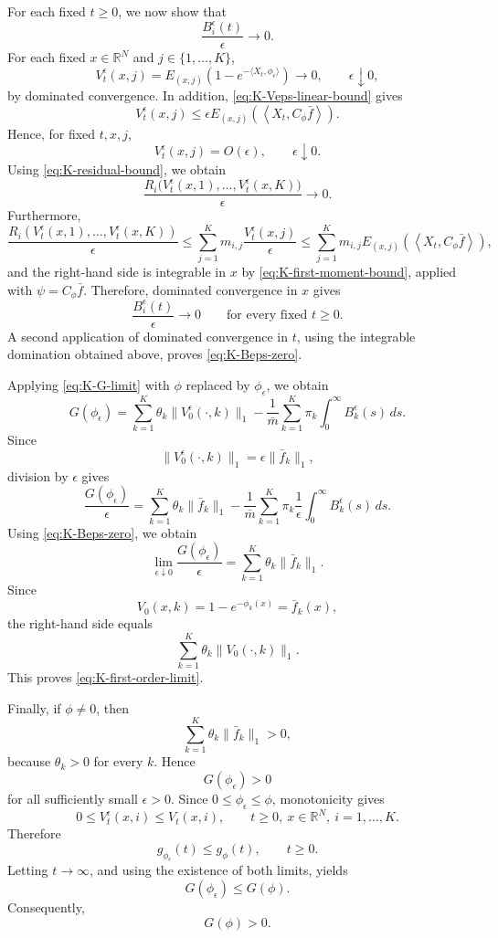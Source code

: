 \documentclass[reqno,final,11pt]{amsart}
\newcommand{\1}{\mathbbm{1}}
\theoremstyle{plain}
\theoremstyle{definition}
\theoremstyle{remark}
\begin{document}
For each fixed \(t\ge0\), we now show that
\[
\frac{B_i^\epsilon(t)}{\epsilon}\longrightarrow0.
\]
For each fixed \(x\in\mathbb R^N\) and \(j\in\{1,\dots,K\}\),
\[
V_t^\epsilon(x,j)
=
E_{(x,j)}
\left(
1-e^{-\langle X_t,\phi_\epsilon\rangle}
\right)
\longrightarrow0,
\qquad \epsilon\downarrow0,
\]
by dominated convergence. In addition, \eqref{eq:K-Veps-linear-bound} gives
\[
V_t^\epsilon(x,j)
\le
\epsilon
E_{(x,j)}
\left(
\left\langle X_t,C_\phi\bar f\right\rangle
\right).
\]
Hence, for fixed \(t,x,j\),
\[
V_t^\epsilon(x,j)=O(\epsilon),
\qquad \epsilon\downarrow0.
\]
Using \eqref{eq:K-residual-bound}, we obtain
\[
\frac{
R_i\bigl(V_t^\epsilon(x,1),\dots,V_t^\epsilon(x,K)\bigr)
}{\epsilon}
\longrightarrow0.
\]
Furthermore,
\[
\frac{R_i(V_t^\epsilon(x,1),\dots,V_t^\epsilon(x,K))}{\epsilon}
\le
\sum_{j=1}^K m_{i,j}
\frac{V_t^\epsilon(x,j)}{\epsilon}
\le
\sum_{j=1}^K m_{i,j}
E_{(x,j)}
\left(
\left\langle X_t,C_\phi\bar f\right\rangle
\right),
\]
and the right-hand side is integrable in \(x\) by \eqref{eq:K-first-moment-bound}, applied
with \(\psi=C_\phi\bar f\). Therefore, dominated convergence in \(x\) gives
\[
\frac{B_i^\epsilon(t)}{\epsilon}\longrightarrow0
\qquad
\text{for every fixed }t\ge0.
\]
A second application of dominated convergence in \(t\), using the integrable domination
obtained above, proves \eqref{eq:K-Beps-zero}.

Applying \eqref{eq:K-G-limit} with \(\phi\) replaced by \(\phi_\epsilon\), we obtain
\[
G(\phi_\epsilon)
=
\sum_{k=1}^K\theta_k\|V_0^\epsilon(\cdot,k)\|_1
-
\frac1{\bar m}
\sum_{k=1}^K\pi_k\int_0^\infty B_k^\epsilon(s)\,ds.
\]
Since
\[
\|V_0^\epsilon(\cdot,k)\|_1
=
\epsilon\|\bar f_k\|_1,
\]
division by \(\epsilon\) gives
\[
\frac{G(\phi_\epsilon)}{\epsilon}
=
\sum_{k=1}^K\theta_k\|\bar f_k\|_1
-
\frac1{\bar m}
\sum_{k=1}^K\pi_k
\frac1\epsilon
\int_0^\infty B_k^\epsilon(s)\,ds.
\]
Using \eqref{eq:K-Beps-zero}, we obtain
\[
\lim_{\epsilon\downarrow0}
\frac{G(\phi_\epsilon)}{\epsilon}
=
\sum_{k=1}^K\theta_k\|\bar f_k\|_1.
\]
Since
\[
V_0(x,k)=1-e^{-\phi_k(x)}=\bar f_k(x),
\]
the right-hand side equals
\[
\sum_{k=1}^K\theta_k\|V_0(\cdot,k)\|_1.
\]
This proves \eqref{eq:K-first-order-limit}.

Finally, if \(\phi\neq0\), then
\[
\sum_{k=1}^K\theta_k\|\bar f_k\|_1>0,
\]
because \(\theta_k>0\) for every \(k\). Hence
\[
G(\phi_\epsilon)>0
\]
for all sufficiently small \(\epsilon>0\). Since \(0\le\phi_\epsilon\le\phi\), monotonicity gives
\[
0\le V_t^\epsilon(x,i)\le V_t(x,i),
\qquad
t\ge0,\ x\in\mathbb R^N,\ i=1,\dots,K.
\]
Therefore
\[
g_{\phi_\epsilon}(t)\le g_\phi(t),
\qquad t\ge0.
\]
Letting \(t\to\infty\), and using the existence of both limits, yields
\[
G(\phi_\epsilon)\le G(\phi).
\]
Consequently,
\[
G(\phi)>0.
\]
\end{document}
